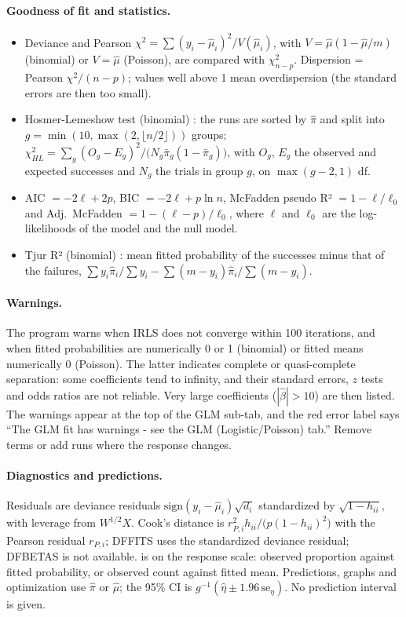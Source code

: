 \paragraph{Goodness of fit and statistics.}
\begin{itemize}
  \item Deviance and Pearson $\chi^2=\sum(y_i-\hat\mu_i)^2/V(\hat\mu_i)$, with $V=\hat\mu(1-\hat\mu/m)$
        (binomial) or $V=\hat\mu$ (Poisson), are compared with $\chi^2_{n-p}$. Dispersion = Pearson
        $\chi^2/(n-p)$; values well above 1 mean overdispersion (the standard errors are then too small).
  \item Hosmer-Lemeshow test (binomial) \citep{hosmer1980}: the runs are sorted by $\hat\pi$ and split into
        $g=\min(10,\max(2,\lfloor n/2\rfloor))$ groups;
        $\chi^2_{HL}=\sum_g(O_g-E_g)^2/\big(N_g\bar\pi_g(1-\bar\pi_g)\big)$, with $O_g$, $E_g$ the observed
        and expected successes and $N_g$ the trials in group $g$, on $\max(g-2,1)$ df.
  \item AIC $=-2\ell+2p$, BIC $=-2\ell+p\ln n$, McFadden pseudo R² $=1-\ell/\ell_0$ and Adj.\ McFadden
        $=1-(\ell-p)/\ell_0$, where $\ell$ and $\ell_0$ are the log-likelihoods of the model and the null
        model.
  \item Tjur R² (binomial) \citep{tjur2009}: mean fitted probability of the successes minus that of the
        failures, $\sum y_i\hat\pi_i/\sum y_i-\sum(m-y_i)\hat\pi_i/\sum(m-y_i)$.
\end{itemize}

\paragraph{Warnings.} The program warns when IRLS does not converge within 100 iterations, and when fitted
probabilities are numerically 0 or 1 (binomial) or fitted means numerically 0 (Poisson). The latter
indicates complete or quasi-complete separation: some coefficients tend to infinity, and their standard
errors, $z$ tests and odds ratios are not reliable. Very large coefficients ($|\hat\beta|>10$) are then
listed. The warnings appear at the top of the GLM sub-tab, and the red error label says ``The GLM fit has
warnings - see the GLM (Logistic/Poisson) tab.'' Remove terms or add runs where the response changes.

\paragraph{Diagnostics and predictions.} Residuals are deviance residuals
$\text{sign}(y_i-\hat\mu_i)\sqrt{d_i}$ standardized by $\sqrt{1-h_{ii}}$, with leverage from $W^{1/2}X$.
Cook's distance is $r_{P,i}^2h_{ii}/\big(p(1-h_{ii})^2\big)$ with the Pearson residual $r_{P,i}$; DFFITS uses
the standardized deviance residual; DFBETAS is not available.  is on the response
scale: observed proportion against fitted probability, or observed count against fitted mean. Predictions,
graphs and optimization use $\hat\pi$ or $\hat\mu$; the 95\% CI is $g^{-1}(\hat\eta\pm1.96\,\text{se}_\eta)$.
No prediction interval is given.

